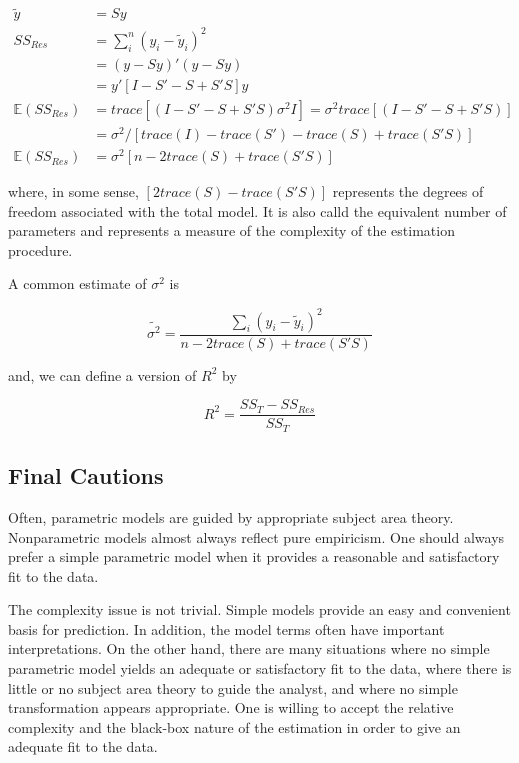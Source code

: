 \documentclass[12pt]{article}
\begin{document}
$$
\begin{aligned}
\tilde{y} &= Sy \\[10pt]
SS_{Res} &= \sum_i^n (y_i - \tilde{y}_i)^2 \\[8pt]
&= (y - Sy)'(y - Sy) \\[8pt]
&= y'[I - S' - S + S'S]y \\[10pt]
\mathbb{E}(SS_{Res}) &= trace[(I - S' - S + S'S)\sigma^2 I] = \sigma^2 trace[(I - S' - S + S'S)]\\[8pt]
&= \sigma^2/[trace(I) - trace(S') - trace(S) + trace(S'S)] \\[10pt]
\mathbb{E}(SS_{Res}) &= \sigma^2 [n- 2trace(S) + trace(S'S)]
\end{aligned}
$$

where, in some sense, $[2trace(S) - trace(S'S)]$ represents the degrees of freedom associated with the total model. It is also calld the equivalent number of parameters and represents a measure of the complexity of the estimation procedure.

A common estimate of $\sigma^2$ is

$$
\tilde{\sigma^2} = \frac{\sum_i (y_i - \tilde{y}_i)^2}{n - 2 trace(S) + trace(S'S)}
$$

and, we can define a version of $R^2$ by 

$$
R^2 = \frac{SS_T - SS_{Res}}{SS_T}
$$


\subsection{Final Cautions}

Often, parametric models are guided by appropriate subject area theory. Nonparametric models almost always reflect pure empiricism. One should always prefer a simple parametric model when it provides a reasonable and satisfactory fit to the data. 

The complexity issue is not trivial. Simple models provide an easy and convenient basis for prediction. In addition, the model terms often have important interpretations. On the other hand, there are many situations where no simple parametric model yields an adequate or satisfactory fit to the data, where there is little or no subject area theory to guide the analyst, and where no simple transformation appears appropriate. One is willing to accept the relative complexity and the black-box nature of the estimation in order to give an adequate fit to the data. 



\end{document}
